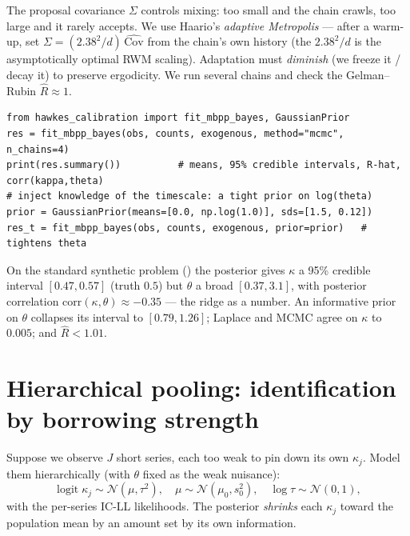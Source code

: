 \begin{whybox}
The proposal covariance $\Sigma$ controls mixing: too small and the chain crawls,
too large and it rarely accepts. We use Haario's \emph{adaptive Metropolis} ---
after a warm-up, set $\Sigma=(2.38^2/d)\,\widehat{\mathrm{Cov}}$ from the chain's own
history (the $2.38^2/d$ is the asymptotically optimal RWM scaling). Adaptation must
\emph{diminish} (we freeze it / decay it) to preserve ergodicity. We run several
chains and check the Gelman--Rubin $\hat R\approx1$.
\end{whybox}

\begin{lstlisting}[caption={Bayesian fit: posterior over $(\kappa,\theta)$ from counts (from \code{bayes.py}).}]
from hawkes_calibration import fit_mbpp_bayes, GaussianPrior
res = fit_mbpp_bayes(obs, counts, exogenous, method="mcmc", n_chains=4)
print(res.summary())          # means, 95% credible intervals, R-hat, corr(kappa,theta)
# inject knowledge of the timescale: a tight prior on log(theta)
prior = GaussianPrior(means=[0.0, np.log(1.0)], sds=[1.5, 0.12])
res_t = fit_mbpp_bayes(obs, counts, exogenous, prior=prior)   # tightens theta
\end{lstlisting}

\begin{examplebox}
On the standard synthetic problem () the posterior gives
$\kappa$ a 95\% credible interval $[0.47,0.57]$ (truth $0.5$) but $\theta$ a broad
$[0.37,3.1]$, with posterior correlation $\mathrm{corr}(\kappa,\theta)\approx-0.35$
--- the ridge as a number. An informative prior on $\theta$ collapses its interval
to $[0.79,1.26]$; Laplace and MCMC agree on $\kappa$ to $0.005$; and $\hat R<1.01$.
\end{examplebox}

\section{Hierarchical pooling: identification by borrowing strength}

Suppose we observe $J$ short series, each too weak to pin down its own $\kappa_j$.
Model them hierarchically (with $\theta$ fixed as the weak nuisance):
\begin{equation}
\operatorname{logit}\kappa_j\sim\mathcal N(\mu,\tau^2),\quad
\mu\sim\mathcal N(\mu_0,s_0^2),\quad \log\tau\sim\mathcal N(0,1),
\end{equation}
with the per-series IC-LL likelihoods. The posterior \emph{shrinks} each
$\kappa_j$ toward the population mean by an amount set by its own information.

